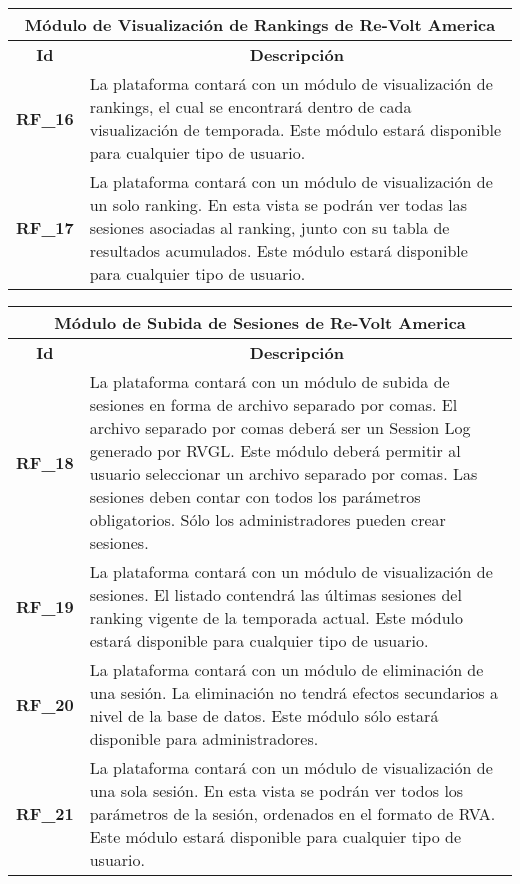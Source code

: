 \begin{center}
	\begin{tabular}{ | l | p{15cm} |}
		\hline
		\multicolumn{2}{|c|}{\textbf{Módulo de Visualización de Rankings de Re-Volt America}} \\
		\hline
		\multicolumn{1}{|c|}{\textbf{Id}} & \multicolumn{1}{|c|}{\textbf{Descripción}} \\
		\hline
		
		{\textbf{RF\_16}} & La plataforma contará con un módulo de visualización de rankings, el cual se encontrará dentro de cada visualización de temporada. Este módulo estará disponible para cualquier tipo de usuario. \\ \hline
		
		{\textbf{RF\_17}} & La plataforma contará con un módulo de visualización de un solo ranking. En esta vista se podrán ver todas las sesiones asociadas al ranking, junto con su tabla de resultados acumulados. Este módulo estará disponible para cualquier tipo de usuario. \\ \hline
	\end{tabular}
\end{center}

\begin{center}
	\begin{tabular}{ | l | p{15cm} |}
		\hline
		\multicolumn{2}{|c|}{\textbf{Módulo de Subida de Sesiones de Re-Volt America}} \\
		\hline
		\multicolumn{1}{|c|}{\textbf{Id}} & \multicolumn{1}{|c|}{\textbf{Descripción}} \\
		\hline
		{\textbf{RF\_18}} & La plataforma contará con un módulo de subida de sesiones en forma de archivo separado por comas. El archivo separado por comas deberá ser un Session Log generado por RVGL. Este módulo deberá permitir al usuario seleccionar un archivo separado por comas. Las sesiones deben contar con todos los parámetros obligatorios. Sólo los administradores pueden crear sesiones. \\ \hline
		
		{\textbf{RF\_19}} & La plataforma contará con un módulo de visualización de sesiones. El listado contendrá las últimas sesiones del ranking vigente de la temporada actual. Este módulo estará disponible para cualquier tipo de usuario. \\ \hline
		
		{\textbf{RF\_20}} & La plataforma contará con un módulo de eliminación de una sesión. La eliminación no tendrá efectos secundarios a nivel de la base de datos. Este módulo sólo estará disponible para administradores. \\ \hline
		
		{\textbf{RF\_21}} & La plataforma contará con un módulo de visualización de una sola sesión. En esta vista se podrán ver todos los parámetros de la sesión, ordenados en el formato de RVA. Este módulo estará disponible para cualquier tipo de usuario. \\ \hline
	\end{tabular}
\end{center}

